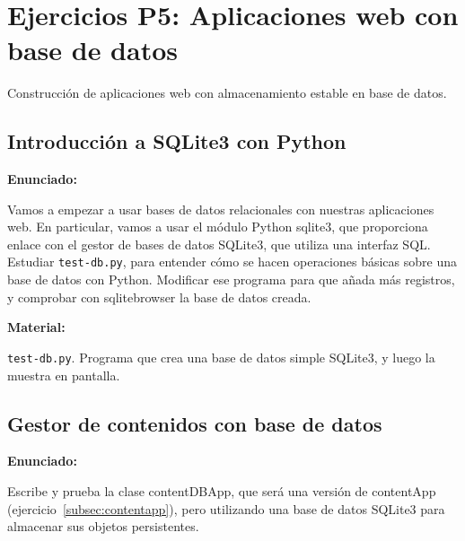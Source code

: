 \section{Ejercicios P5: Aplicaciones web con base de datos}

Construcción de aplicaciones web con almacenamiento estable en base de datos.

\subsection{Introducción a SQLite3 con Python}
\label{subsec:sqlite3-python}

\textbf{Enunciado:}

Vamos a empezar a usar bases de datos relacionales con nuestras aplicaciones web. En particular, vamos a usar el módulo Python sqlite3, que proporciona enlace con el gestor de bases de datos SQLite3, que utiliza una interfaz SQL. Estudiar \texttt{test-db.py}, para entender cómo se hacen operaciones básicas sobre una base de datos con Python. Modificar ese programa para que añada más registros, y comprobar con sqlitebrowser la base de datos creada.

\textbf{Material:}

\texttt{test-db.py}. Programa que crea una base de datos simple SQLite3, y luego la muestra en pantalla.

\subsection{Gestor de contenidos con base de datos}
\label{subsec:gestor-contenidos-bbdd}

\textbf{Enunciado:}

Escribe y prueba la clase contentDBApp, que será una versión de contentApp (ejercicio~\ref{subsec:contentapp}), pero utilizando una base de datos SQLite3 para almacenar sus objetos persistentes.

